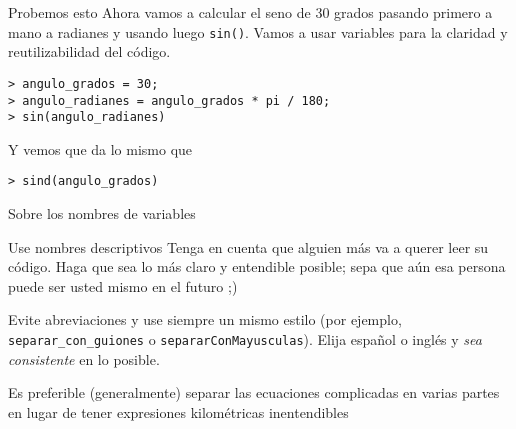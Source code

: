 \begin{frame}[fragile]{Probemos esto} %
	Ahora vamos a calcular el seno de 30 grados pasando primero a mano a radianes y usando luego \verb!sin()!. Vamos a usar variables para la claridad y reutilizabilidad del código.
\begin{lstlisting}
> angulo_grados = 30;
> angulo_radianes = angulo_grados * pi / 180;
> sin(angulo_radianes)
\end{lstlisting}
	Y vemos que da lo mismo que
\begin{lstlisting}
> sind(angulo_grados)
\end{lstlisting}

\end{frame}

\begin{frame}[fragile]{Sobre los nombres de variables}
	\begin{alertblock}{Use nombres descriptivos}
	Tenga en cuenta que alguien más va a querer leer su código. Haga que sea lo más claro y entendible posible; sepa que aún esa persona puede ser usted mismo en el futuro ;)
	
	Evite abreviaciones y use siempre un mismo estilo (por ejemplo, \verb!separar_con_guiones! o \verb!separarConMayusculas!). Elija español o inglés y \emph{sea consistente} en lo posible.
	
	Es preferible (generalmente) separar las ecuaciones complicadas en varias partes en lugar de tener expresiones kilométricas inentendibles
	\end{alertblock}
\end{frame}

